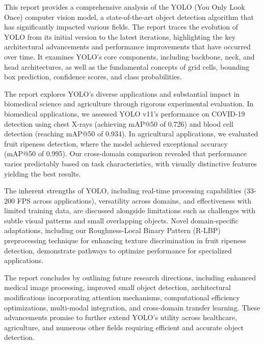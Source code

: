 This report provides a comprehensive analysis of the YOLO (You Only Look Once) computer vision model, a state-of-the-art object detection algorithm that has significantly impacted various fields. The report traces the evolution of YOLO from its initial version to the latest iterations, highlighting the key architectural advancements and performance improvements that have occurred over time. It examines YOLO's core components, including backbone, neck, and head architectures, as well as the fundamental concepts of grid cells, bounding box prediction, confidence scores, and class probabilities. 

The report explores YOLO's diverse applications and substantial impact in biomedical science and agriculture through rigorous experimental evaluation. In biomedical applications, we assessed YOLO v11's performance on COVID-19 detection using chest X-rays (achieving mAP@50 of 0.726) and blood cell detection (reaching mAP@50 of 0.934). In agricultural applications, we evaluated fruit ripeness detection, where the model achieved exceptional accuracy (mAP@50 of 0.995). Our cross-domain comparison revealed that performance varies predictably based on task characteristics, with visually distinctive features yielding the best results.

The inherent strengths of YOLO, including real-time processing capabilities (33-200 FPS across applications), versatility across domains, and effectiveness with limited training data, are discussed alongside limitations such as challenges with subtle visual patterns and small overlapping objects. Novel domain-specific adaptations, including our Roughness-Local Binary Pattern (R-LBP) preprocessing technique for enhancing texture discrimination in fruit ripeness detection, demonstrate pathways to optimize performance for specialized applications.

The report concludes by outlining future research directions, including enhanced medical image processing, improved small object detection, architectural modifications incorporating attention mechanisms, computational efficiency optimizations, multi-modal integration, and cross-domain transfer learning. These advancements promise to further extend YOLO's utility across healthcare, agriculture, and numerous other fields requiring efficient and accurate object detection.